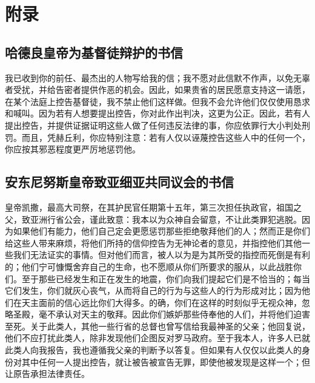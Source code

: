 
\section{附录}


\subsection{哈德良皇帝为基督徒辩护的书信}

我已收到你的前任、最杰出的人物写给我的信；我不愿对此信默不作声，以免无辜者受扰，并给告密者提供作恶的机会。因此，如果贵省的居民愿意支持这一请愿，在某个法庭上控告基督徒，我不禁止他们这样做。但我不会允许他们仅仅使用恳求和喊叫。因为若有人想要提出控告，你对此作出判决，这更为公正。因此，若有人提出控告，并提供证据证明这些人做了任何违反法律的事，你应依罪行大小判处刑罚。而且，凭赫丘利，你应特别注意：若有人仅以诬蔑控告这些人中的任何一个，你应按其邪恶程度更严厉地惩罚他。\par


\subsection{安东尼努斯皇帝致亚细亚共同议会的书信}

皇帝凯撒，最高大司祭，在其护民官任期第十五年，第三次担任执政官，祖国之父，致亚洲行省公会，谨此致意：我本以为众神自会留意，不让此类罪犯逃脱。因为如果他们有能力，他们自己定会更愿惩罚那些拒绝敬拜他们的人；然而正是你们给这些人带来麻烦，将他们所持的信仰控告为无神论者的意见，并指控他们其他一些我们无法证实的事情。但对他们而言，被人以为是为其所受的指控而死倒是有利的；他们宁可慷慨舍弃自己的生命，也不愿顺从你们所要求的服从，以此战胜你们。至于那些已经发生和正在发生的地震，你们向我们提起它们是不恰当的；每当它们发生，你们就灰心丧气，从而将自己的行为与这些人的行为形成对比；因为他们在天主面前的信心远比你们大得多。的确，你们在这样的时刻似乎无视众神，忽略圣殿，毫不承认对天主的敬拜。因此你们嫉妒那些侍奉他的人们，并将他们迫害至死。关于此类人，其他一些行省的总督也曾写信给我最神圣的父亲；他回复说，他们不应打扰此类人，除非发现他们企图反对罗马政府。至于我本人，许多人已就此类人向我报告，我也遵循我父亲的判断予以答复。但如果有人仅仅以此类人的身份对其中任何一人提出控告，就让被告被宣告无罪，即使他被发现是这样一个；但让原告承担法律责任。\par

